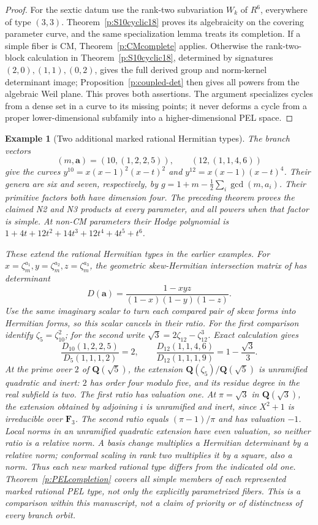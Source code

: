 \documentclass[11pt,reqno]{article}
\theoremstyle{emphasizedplain}
\theoremstyle{emphasizeddefinition}
\newtheorem{example}[theorem]{Example}
\theoremstyle{emphasizeddefinition}
\newcommand{\Q}{\mathbf Q}
\begin{document}
\begin{proof}
For the sextic datum use the rank-two subvariation $W_k$ of $R^6$,
everywhere of type $(3,3)$. Theorem~\ref{p:S10cyclic18} proves its
algebraicity on the covering parameter curve, and the same
specialization lemma treats its completion. If a simple fiber is CM,
Theorem~\ref{p:CMcomplete} applies. Otherwise the rank-two-block
calculation in Theorem~\ref{p:S10cyclic18}, determined by signatures
$(2,0),(1,1),(0,2)$, gives the full derived group and norm-kernel
determinant image; Proposition~\ref{p:coupled-det} then gives all powers
from the algebraic Weil plane. This proves both assertions.
The argument specializes cycles from a dense set in a curve to its
missing points; it never deforms a cycle from a proper lower-dimensional
subfamily into a higher-dimensional PEL space.
\end{proof}

\begin{example}[Two additional marked rational Hermitian types]
\label{ex:weighted-newtypes}
The branch vectors
\[
 (m,\boldsymbol a)=(10,(1,2,2,5)),\qquad(12,(1,1,4,6))
\]
give the curves
$y^{10}=x(x-1)^2(x-t)^2$ and
$y^{12}=x(x-1)(x-t)^4$. Their genera are six and seven, respectively,
by $g=1+m-\frac12\sum_i\gcd(m,a_i)$. Their primitive factors both
have dimension four. The preceding theorem proves the claimed N2
and N3 products at every parameter, and all powers when that factor
is simple. At non-CM parameters their Hodge polynomial is
$1+4t+12t^2+14t^3+12t^4+4t^5+t^6$.

These extend the rational Hermitian types in the earlier examples.
For $x=\zeta_m^{a_1},y=\zeta_m^{a_2},z=\zeta_m^{a_3}$, the geometric
skew-Hermitian intersection matrix of \cite[Proposition 7.4]{YuZheng}
has determinant
\[
 D(\boldsymbol a)=\frac{1-xyz}{(1-x)(1-y)(1-z)}.
\]
Use the same imaginary scalar to turn each compared pair of skew
forms into Hermitian forms, so this scalar cancels in their ratio.
For the first comparison identify $\zeta_5=\zeta_{10}^2$; for the
second write $\sqrt3=2\zeta_{12}-\zeta_{12}^3$. Exact calculation gives
\[
 \frac{D_{10}(1,2,2,5)}{D_5(1,1,1,2)}=2,\qquad
 \frac{D_{12}(1,1,4,6)}{D_{12}(1,1,1,9)}
       =1-\frac{\sqrt3}{3}.
\]
At the prime over $2$ of $\Q(\sqrt5)$, the extension
$\Q(\zeta_5)/\Q(\sqrt5)$ is unramified quadratic and inert:
$2$ has order four modulo five, and its residue degree in the real
subfield is two. The first ratio has valuation one. At
$\pi=\sqrt3$ in $\Q(\sqrt3)$, the extension obtained by adjoining
$i$ is unramified and inert, since $X^2+1$ is irreducible over
$\mathbf F_3$. The second ratio equals $(\pi-1)/\pi$ and has
valuation $-1$. Local norms in an unramified quadratic extension
have even valuation, so neither ratio is a relative norm.
A basis change multiplies a Hermitian determinant by a relative norm;
conformal scaling in rank two multiplies it by a square, also a norm.
Thus each new marked rational type differs from the indicated old
one. Theorem~\ref{p:PELcompletion} covers all simple members of each
represented marked rational PEL type, not only the explicitly
parametrized fibers. This is a comparison within this manuscript,
not a claim of priority or of distinctness of every branch orbit.
\end{example}
\end{document}

